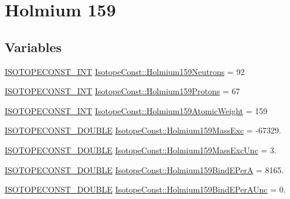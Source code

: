 \hypertarget{group___isotope_const-_holmium-_ho159}{}\section{Holmium 159}
\label{group___isotope_const-_holmium-_ho159}
\subsection*{Variables}
\begin{DoxyCompactItemize}
\item 
\mbox{\hyperlink{group___isotope_const-_macros_ga5f18360b3e99483a35c32d789e62621c}{I\+S\+O\+T\+O\+P\+E\+C\+O\+N\+S\+T\+\_\+\+I\+NT}} \mbox{\hyperlink{group___isotope_const-_holmium-_ho159_ga36d30646944d8d12933f02132bad0eac}{Isotope\+Const\+::\+Holmium159\+Neutrons}} = 92
\item 
\mbox{\hyperlink{group___isotope_const-_macros_ga5f18360b3e99483a35c32d789e62621c}{I\+S\+O\+T\+O\+P\+E\+C\+O\+N\+S\+T\+\_\+\+I\+NT}} \mbox{\hyperlink{group___isotope_const-_holmium-_ho159_ga78b1080c75e817ade01e2c6f60076ad3}{Isotope\+Const\+::\+Holmium159\+Protons}} = 67
\item 
\mbox{\hyperlink{group___isotope_const-_macros_ga5f18360b3e99483a35c32d789e62621c}{I\+S\+O\+T\+O\+P\+E\+C\+O\+N\+S\+T\+\_\+\+I\+NT}} \mbox{\hyperlink{group___isotope_const-_holmium-_ho159_ga4aff6dd922ec4a16517ec87341fa4a70}{Isotope\+Const\+::\+Holmium159\+Atomic\+Weight}} = 159
\item 
\mbox{\hyperlink{group___isotope_const-_macros_ga8f45a7272ce02c0b4c65c44636ed719a}{I\+S\+O\+T\+O\+P\+E\+C\+O\+N\+S\+T\+\_\+\+D\+O\+U\+B\+LE}} \mbox{\hyperlink{group___isotope_const-_holmium-_ho159_ga93fe5c9cfabd90f1652f6d889e9395c1}{Isotope\+Const\+::\+Holmium159\+Mass\+Exc}} = -\/67329.
\item 
\mbox{\hyperlink{group___isotope_const-_macros_ga8f45a7272ce02c0b4c65c44636ed719a}{I\+S\+O\+T\+O\+P\+E\+C\+O\+N\+S\+T\+\_\+\+D\+O\+U\+B\+LE}} \mbox{\hyperlink{group___isotope_const-_holmium-_ho159_gac9e372400f125371833902b8a113af7a}{Isotope\+Const\+::\+Holmium159\+Mass\+Exc\+Unc}} = 3.
\item 
\mbox{\hyperlink{group___isotope_const-_macros_ga8f45a7272ce02c0b4c65c44636ed719a}{I\+S\+O\+T\+O\+P\+E\+C\+O\+N\+S\+T\+\_\+\+D\+O\+U\+B\+LE}} \mbox{\hyperlink{group___isotope_const-_holmium-_ho159_ga9c31e1cc10ae1b36f9e7b46ba4caff6f}{Isotope\+Const\+::\+Holmium159\+Bind\+E\+PerA}} = 8165.
\item 
\mbox{\hyperlink{group___isotope_const-_macros_ga8f45a7272ce02c0b4c65c44636ed719a}{I\+S\+O\+T\+O\+P\+E\+C\+O\+N\+S\+T\+\_\+\+D\+O\+U\+B\+LE}} \mbox{\hyperlink{group___isotope_const-_holmium-_ho159_gaa880dea00ad7131c728f269099978dbd}{Isotope\+Const\+::\+Holmium159\+Bind\+E\+Per\+A\+Unc}} = 0.

\end{DoxyCompactItemize}
